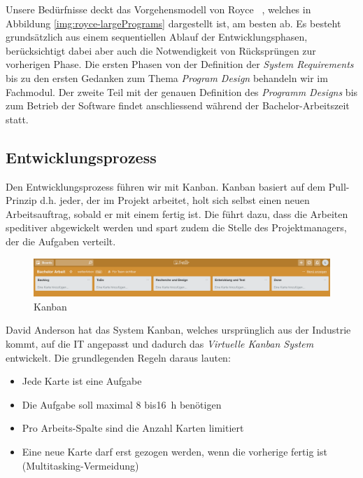 Unsere Bedürfnisse deckt das Vorgehensmodell von Royce ~\cite{Royce1970}, welches in Abbildung  \ref{img:royce-largePrograms} dargestellt ist, am besten ab. Es besteht grundsätzlich aus einem sequentiellen Ablauf der Entwicklungsphasen, berücksichtigt dabei aber auch die Notwendigkeit von Rücksprüngen zur vorherigen Phase.
Die ersten Phasen von der Definition der \textit{System Requirements} bis zu den ersten Gedanken zum Thema \textit{Program Design} behandeln wir im Fachmodul. Der zweite Teil mit der genauen Definition des \textit{Programm Designs} bis zum Betrieb der Software findet anschliessend während der Bachelor-Arbeitszeit statt.


\subsection{Entwicklungsprozess}
Den Entwicklungsprozess führen wir mit Kanban. Kanban basiert auf dem Pull-Prinzip d.h. jeder, der im Projekt arbeitet, holt sich selbst einen neuen Arbeitsauftrag, sobald er mit einem fertig ist. Die führt dazu, dass die Arbeiten speditiver abgewickelt werden und spart zudem die Stelle des Projektmanagers, der die Aufgaben verteilt.

\begin{figure}[htbp]
	\centering
	\includegraphics[width=1\linewidth]{img/kanban}
	\caption{Kanban}
	\label{img:kanban}
\end{figure}


David Anderson \cite{AndersonDavidJ2011K:eC} hat das System Kanban, welches ursprünglich aus der Industrie kommt, auf die IT angepasst und dadurch das \textit{Virtuelle Kanban System} entwickelt. Die grundlegenden Regeln daraus lauten:

\begin{itemize}  
\item Jede Karte ist eine Aufgabe
\item Die Aufgabe soll maximal 8 bis16~h benötigen
\item Pro Arbeits-Spalte sind die Anzahl Karten limitiert
\item Eine neue Karte darf erst gezogen werden, wenn die vorherige fertig ist (Multitasking-Vermeidung)
\end{itemize}

